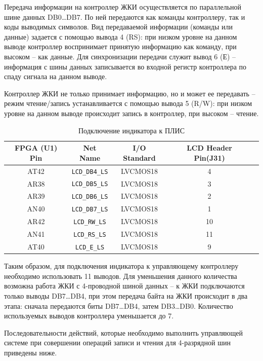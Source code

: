 \documentclass[a4paper,oneside ,14pt]{extreport}
\begin{document}
Передача информации на контроллер ЖКИ осуществляется по 
параллельной шине данных DB0…DB7. 
По ней передаются как команды контроллеру, так и коды выводимых символов. 
Вид передаваемой информации (команды или данные) задается 
с помощью вывода 4 (RS): при низком уровне на данном выводе 
контроллер воспринимает принятую информацию как команду, при высоком – как данные. 
Для синхронизации передачи служит вывод 6 (Е) – 
информация с шины данных записывается во входной регистр контроллера 
по спаду сигнала на данном выводе.

Контроллер ЖКИ не только принимает информацию, но и может 
ее передавать – режим чтение/запись устанавливается с помощью 
вывода 5 (R/W): при низком уровне на данном выводе происходит 
запись в контроллер, при высоком – чтение.

\begin{table}[!ht]
	\begin{center}
		\begin{tabular}{c c c c c}
			\hline\hline
			FPGA (U1) Pin & Net Name &  I/O Standard & LCD Header Pin(J31) \\
			\hline
			AT42 & \verb|LCD_DB4_LS| & LVCMOS18 & 4 \\
			AR38 & \verb|LCD_DB5_LS| & LVCMOS18 & 3 \\
			AR39 & \verb|LCD_DB6_LS| & LVCMOS18 & 2 \\
			AN40 & \verb|LCD_DB7_LS| & LVCMOS18 & 1 \\
			AR42 & \verb|LCD_RW_LS| & LVCMOS18 & 10 \\
			AN41 & \verb|LCD_RS_LS| & LVCMOS18 & 11 \\
			AT40 & \verb|LCD_E_LS| & LVCMOS18 & 9 \\
			\hline
		\end{tabular}
		\caption{Подключение индикатора к ПЛИС}
		\label{LCD_TO_FPGA}
	\end{center}
\end{table}

Таким образом, для подключения индикатора к управляющему 
контроллеру необходимо использовать 11 выводов. Для уменьшения 
данного количества возможна работа ЖКИ с 4-проводной шиной 
данных – к ЖКИ подключаются только выводы DB7…DB4, при 
этом передача байта на ЖКИ происходит в два этапа: сначала передаются биты DB7…DB4, затем DB3…DB0. Количество используемых выводов контроллера уменьшается до 7.

Последовательности действий, которые необходимо выполнить 
управляющей системе при совершении операций записи и чтения 
для 4-разрядной шин приведены ниже.
\end{document}
